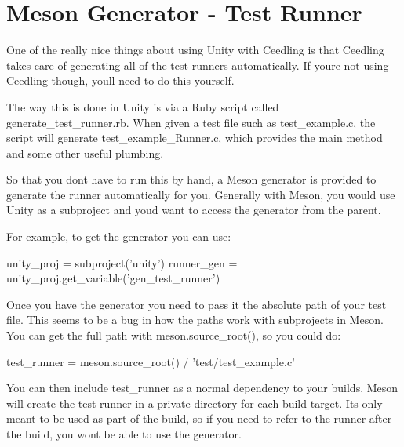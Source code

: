 \chapter{Meson Generator -\/ Test Runner}
\hypertarget{md__unity_2docs_2_meson_generator_runner}{}\label{md__unity_2docs_2_meson_generator_runner}
\label{md__unity_2docs_2_meson_generator_runner_autotoc_md32}%
%


One of the really nice things about using Unity with Ceedling is that Ceedling takes care of generating all of the test runners automatically. If you\textquotesingle{}re not using Ceedling though, you\textquotesingle{}ll need to do this yourself.

The way this is done in Unity is via a Ruby script called {\ttfamily generate\+\_\+test\+\_\+runner.\+rb}. When given a test file such as {\ttfamily test\+\_\+example.\+c}, the script will generate {\ttfamily test\+\_\+example\+\_\+\+Runner.\+c}, which provides the {\ttfamily main} method and some other useful plumbing.

So that you don\textquotesingle{}t have to run this by hand, a Meson generator is provided to generate the runner automatically for you. Generally with Meson, you would use Unity as a subproject and you\textquotesingle{}d want to access the generator from the parent.

For example, to get the generator you can use\+: \begin{DoxyVerb}unity_proj = subproject('unity')
runner_gen = unity_proj.get_variable('gen_test_runner')
\end{DoxyVerb}


Once you have the generator you need to pass it the absolute path of your test file. This seems to be a bug in how the paths work with subprojects in Meson. You can get the full path with {\ttfamily meson.\+source\+\_\+root()}, so you could do\+: \begin{DoxyVerb}test_runner = meson.source_root() / 'test/test_example.c'
\end{DoxyVerb}


You can then include {\ttfamily test\+\_\+runner} as a normal dependency to your builds. Meson will create the test runner in a private directory for each build target. It\textquotesingle{}s only meant to be used as part of the build, so if you need to refer to the runner after the build, you won\textquotesingle{}t be able to use the generator. 